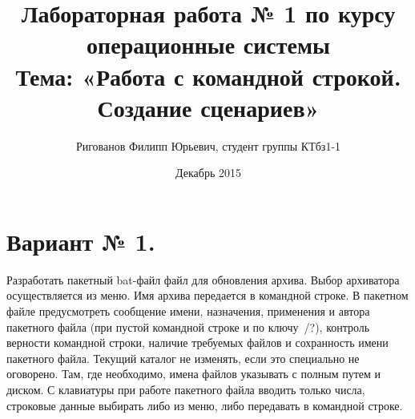 \documentclass{article}
\title{Лабораторная работа № 1 по курсу операционные системы \\
Тема: «Работа с командной строкой. Создание сценариев»}
\author{Ригованов Филипп Юрьевич, студент группы КТбз1-1}
\date{Декабрь 2015}
\begin{document}
\maketitle
\section*{Вариант № 1.}
Разработать пакетный bat-­файл файл для обновления архива. Выбор архиватора осуществляется из меню. Имя архива передается в командной строке.
В пакетном файле предусмотреть сообщение имени, назначения, применения и автора пакетного файла (при пустой командной строке и по ключу~/?), контроль верности командной строки, наличие требуемых файлов и сохранность имени пакетного файла. Текущий каталог не изменять, если это специально не оговорено. Там, где необходимо, имена файлов указывать с полным путем и диском. С клавиатуры при работе пакетного файла вводить только числа, строковые данные выбирать либо из меню, либо передавать в командной строке.
\end{document}
